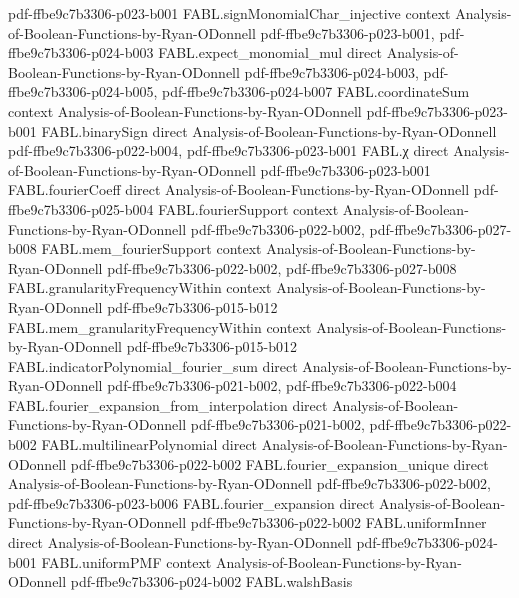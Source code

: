 \begin{theorem}
  {pdf-ffbe9c7b3306-p023-b001}
\proofstep
  {FABL.signMonomialChar_injective}
  {context}
  {Analysis-of-Boolean-Functions-by-Ryan-ODonnell}
  {pdf-ffbe9c7b3306-p023-b001,
    pdf-ffbe9c7b3306-p024-b003}
\proofstep
  {FABL.expect_monomial_mul}
  {direct}
  {Analysis-of-Boolean-Functions-by-Ryan-ODonnell}
  {pdf-ffbe9c7b3306-p024-b003,
    pdf-ffbe9c7b3306-p024-b005,
    pdf-ffbe9c7b3306-p024-b007}
\proofstep
  {FABL.coordinateSum}
  {context}
  {Analysis-of-Boolean-Functions-by-Ryan-ODonnell}
  {pdf-ffbe9c7b3306-p023-b001}
\proofstep
  {FABL.binarySign}
  {direct}
  {Analysis-of-Boolean-Functions-by-Ryan-ODonnell}
  {pdf-ffbe9c7b3306-p022-b004,
    pdf-ffbe9c7b3306-p023-b001}
\proofstep
  {FABL.χ}
  {direct}
  {Analysis-of-Boolean-Functions-by-Ryan-ODonnell}
  {pdf-ffbe9c7b3306-p023-b001}
\proofstep
  {FABL.fourierCoeff}
  {direct}
  {Analysis-of-Boolean-Functions-by-Ryan-ODonnell}
  {pdf-ffbe9c7b3306-p025-b004}
\proofstep
  {FABL.fourierSupport}
  {context}
  {Analysis-of-Boolean-Functions-by-Ryan-ODonnell}
  {pdf-ffbe9c7b3306-p022-b002,
    pdf-ffbe9c7b3306-p027-b008}
\proofstep
  {FABL.mem_fourierSupport}
  {context}
  {Analysis-of-Boolean-Functions-by-Ryan-ODonnell}
  {pdf-ffbe9c7b3306-p022-b002,
    pdf-ffbe9c7b3306-p027-b008}
\proofstep
  {FABL.granularityFrequencyWithin}
  {context}
  {Analysis-of-Boolean-Functions-by-Ryan-ODonnell}
  {pdf-ffbe9c7b3306-p015-b012}
\proofstep
  {FABL.mem_granularityFrequencyWithin}
  {context}
  {Analysis-of-Boolean-Functions-by-Ryan-ODonnell}
  {pdf-ffbe9c7b3306-p015-b012}
\proofstep
  {FABL.indicatorPolynomial_fourier_sum}
  {direct}
  {Analysis-of-Boolean-Functions-by-Ryan-ODonnell}
  {pdf-ffbe9c7b3306-p021-b002,
    pdf-ffbe9c7b3306-p022-b004}
\proofstep
  {FABL.fourier_expansion_from_interpolation}
  {direct}
  {Analysis-of-Boolean-Functions-by-Ryan-ODonnell}
  {pdf-ffbe9c7b3306-p021-b002,
    pdf-ffbe9c7b3306-p022-b002}
\proofstep
  {FABL.multilinearPolynomial}
  {direct}
  {Analysis-of-Boolean-Functions-by-Ryan-ODonnell}
  {pdf-ffbe9c7b3306-p022-b002}
\proofstep
  {FABL.fourier_expansion_unique}
  {direct}
  {Analysis-of-Boolean-Functions-by-Ryan-ODonnell}
  {pdf-ffbe9c7b3306-p022-b002,
    pdf-ffbe9c7b3306-p023-b006}
\proofstep
  {FABL.fourier_expansion}
  {direct}
  {Analysis-of-Boolean-Functions-by-Ryan-ODonnell}
  {pdf-ffbe9c7b3306-p022-b002}
\proofstep
  {FABL.uniformInner}
  {direct}
  {Analysis-of-Boolean-Functions-by-Ryan-ODonnell}
  {pdf-ffbe9c7b3306-p024-b001}
\proofstep
  {FABL.uniformPMF}
  {context}
  {Analysis-of-Boolean-Functions-by-Ryan-ODonnell}
  {pdf-ffbe9c7b3306-p024-b002}
\proofstep
  {FABL.walshBasis}

\end{theorem}
